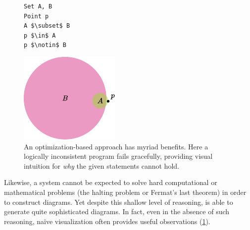 \setlength{\columnsep}{1em}
\setlength{\intextsep}{0em}
\begin{figure}
\begin{minipage}{60pt}
\begin{lstlisting}[language=Sub-ST,escapechar=@,numbers=none]
Set A, B
Point p
A $\subset$ B
p $\in$ A
p $\notin$ B
\end{lstlisting}
\end{minipage}\hfill
\begin{minipage}{120pt}
  \centering
  \includegraphics[width=\linewidth]{assets/penrose/sets-inconsistent.pdf}
\end{minipage}
   \vspace{-.5\baselineskip}\caption{An optimization-based approach has myriad benefits.  Here a logically inconsistent program fails gracefully, providing visual intuition for \emph{why} the given statements cannot hold.\label{fig:sets-inconsistent}}
\end{figure}

Likewise, a system cannot be expected to solve hard computational or mathematical problems (\eg the halting problem or Fermat's last theorem) in order to construct diagrams.  Yet despite this shallow level of reasoning, \Penrose{} is able to generate quite sophisticated diagrams.  In fact, even in the absence of such reasoning, na\"{i}ve visualization often provides useful observations (\cref{fig:sets-inconsistent}).

